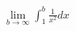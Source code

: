 \documentclass[preview]{standalone}
\begin{document}
\begin{align*}
\lim_{b\to\infty} \int_1^b \frac{1}{x^2} dx
\end{align*}
\end{document}
